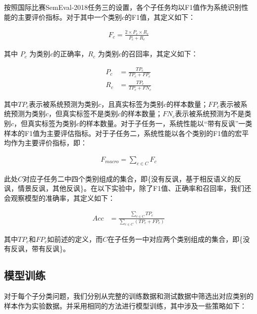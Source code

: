 按照国际比赛SemEval-2018任务三的设置，各个子任务均以F1值作为系统识别性能的主要评价指标。对于其中一个类别$c$的F1值，其定义如下：

\begin{align}
  F_c = \frac{2 \times P_c \times R_c}{P_c + R_c} 
\end{align}

其中 $P_c$ 为类别$c$的正确率，$R_c$ 为类别$c$的召回率，其定义如下：

\begin{align}
  P_c &= \frac{TP_c}{TP_c + FP_c} \\
  R_c &= \frac{TP_c}{TP_c + FN_c}
\end{align} 

其中$TP_c$表示被系统预测为类别$c$，且真实标签为类别$c$的样本数量；$FP_c$表示被系统预测为类别$c$，但真实标签不是类别$c$的样本数量；$FN_c$表示被系统预测为不是类别$c$，但真实标签为类别$c$的样本数量。对于子任务一，系统性能以“带有反讽”一类样本的F1值为主要评估指标。对于子任务二，系统性能以各个类别的F1值的宏平均作为主要评价指标，即：

\begin{align}
  F_{macro} = \sum\limits_{c \in C}F_c
\end{align}

此处$C$对应子任务二中四个类别组成的集合，即\{没有反讽，基于相反语义的反讽，情景反讽，其他反讽\}。在以下实验中，除了F1值、正确率和召回率，我们还会观察模型的准确率，其定义如下：

\begin{align}
  Acc &= \frac{\sum\limits_{c \in C} TP_c}{\sum\limits_{c \in C}(TP_c + FP_c)}
\end{align}

其中$TP_c$和$FP_c$如前述的定义，而$C$在子任务一中对应两个类别组成的集合，即\{没有反讽，带有反讽\}。

\subsection{模型训练}
\label{ssec:exp_irony_det_model_training}

对于每个子分类问题，我们分别从完整的训练数据和测试数据中筛选出对应类别的样本作为实验数据。并采用相同的方法进行模型训练，其中涉及一些策略如下：

